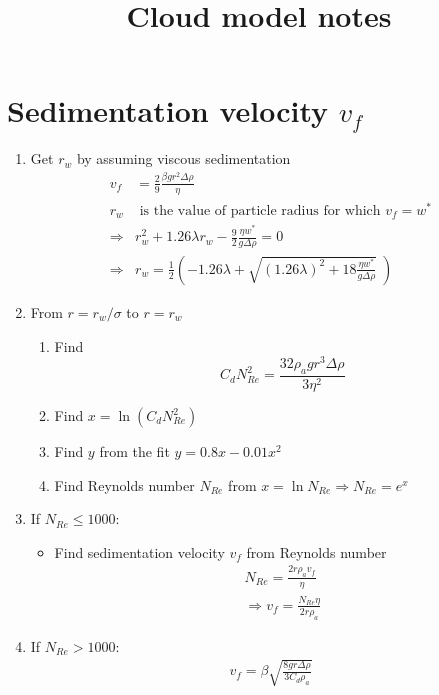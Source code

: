\documentclass[12pt,a4paper]{report}
\begin{document}
\title{Cloud model notes}
\date{}
\maketitle
\chapter*{Sedimentation velocity $v_f$}
\begin{enumerate}
\item Get $r_w$ by assuming viscous sedimentation 
\begin{align*}
v_f &=\frac{2}{9}\frac{\beta g r^2 \Delta\rho}{\eta}\\
r_w&\text{ is the value of particle radius for which }v_f=w^*\\
\Rightarrow & r_w^2 +1.26\lambda r_w -\frac{9}{2}\frac{\eta w^*}{g \Delta\rho}=0\\
\Rightarrow & r_w= \frac{1}{2}\left(-1.26\lambda + \sqrt{\left(1.26\lambda\right)^2+18\frac{\eta w^*}{g \Delta\rho}}\;\right)
\end{align*}
\item From $r=r_w/\sigma$ to $r=r_w$\begin{enumerate}
\item Find \begin{equation*}
C_d N_{Re}^2=\frac{32\rho _a g r^3 \Delta\rho}{3\eta ^2}
\end{equation*}
\item Find $x=\ln\left( C_d N_{Re}^2\right)$
\item Find $y$ from the fit $y=0.8x-0.01x^2$
\item Find Reynolds number $N_{Re}$ from $x=\ln N_{Re}\Rightarrow N_{Re}=e^x$
\end{enumerate}
\item If $N_{Re}\leq 1000$:\begin{itemize}
\item Find sedimentation velocity $v_f$ from Reynolds number \begin{align*}
N_{Re}=\frac{2r\rho _a v_f}{\eta}\\
\Rightarrow v_f=\frac{N_{Re}\eta}{2r\rho _a}
\end{align*}
\end{itemize}
\item If $N_{Re}> 1000$:
\begin{align*}
v_f = \beta\sqrt{\frac{8gr\Delta\rho}{3C_d\rho _a}}
\end{align*}
\end{enumerate}
\end{document}
